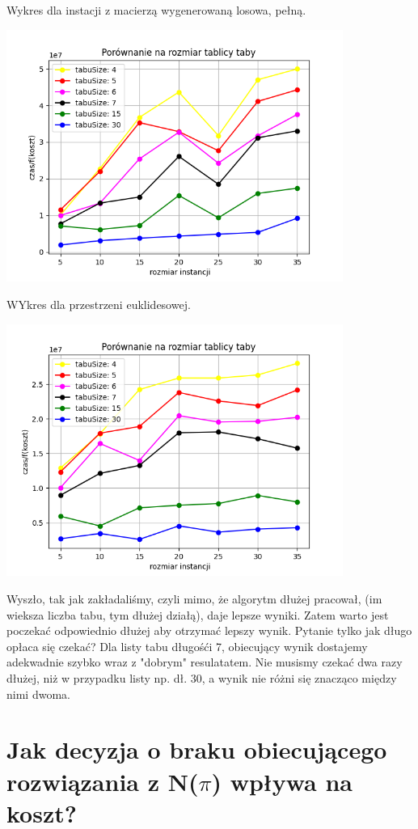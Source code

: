 \documentclass{article}
\begin{document}
    Wykres dla instacji z macierzą wygenerowaną losowa, pełną.

    \includegraphics[width=11cm]{./spr2img/Figure_12.png}

    WYkres dla przestrzeni euklidesowej.

    \includegraphics[width=11cm]{./spr2img/Figure_3_EUC2D.png}

    Wyszło, tak jak zakładaliśmy, czyli mimo, że algorytm dłużej
    pracował, (im wieksza liczba tabu, tym dłużej działą), daje lepsze
    wyniki. Zatem warto jest poczekać odpowiednio dłużej aby otrzymać
    lepszy wynik. Pytanie tylko jak długo opłaca się czekać?
    Dla listy tabu długośći 7, obiecujący wynik dostajemy adekwadnie szybko wraz
    z "dobrym" resulatatem. Nie musismy czekać dwa razy dłużej, niż w przypadku
    listy np. dł. 30, a wynik nie różni się znacząco między nimi dwoma.

    \section{Jak decyzja o braku obiecującego rozwiązania z N($\pi$)
            wpływa na koszt?}
\end{document}
